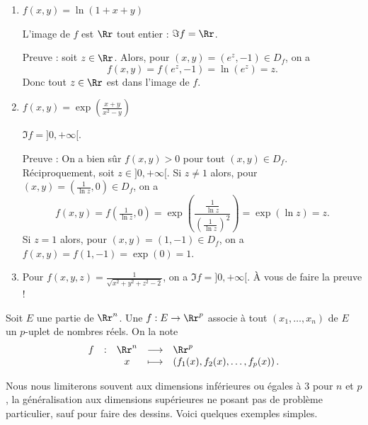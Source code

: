 \documentclass[11pt, class=report,crop=false]{standalone}
\begin{document}
\begin{exemple}
\sauteligne
\begin{enumerate}
  \item $f(x,y) = \ln(1 + x + y)$

  L'image de $f$ est $\Rr$ tout entier : $\Im f = \Rr$.
  
  Preuve : soit $z\in\Rr$. Alors, pour $(x,y) = (e^z,-1) \in D_f$, on a 
  $$f(x,y)= f(e^z,-1) = \ln(e^z)=z.$$ 
  Donc tout $z\in\Rr$ est dans l'image de $f$.
  
  \item $f(x,y) = \exp\left(\frac{x+y}{x^2-y}\right)$
 
  $\Im f = {}]0,+\infty[$.
  
  Preuve : On a bien sûr $f(x,y)>0$ pour tout $(x,y) \in D_f$.
 Réciproquement, soit $z\in {}]0,+\infty[$. 
  Si $z \neq 1$ alors, pour $(x,y)=(\tfrac{1}{\ln z},0) \in D_f$, on a 
  $$f(x,y)= f(\tfrac{1}{\ln z},0) = \exp\left(\frac{\tfrac{1}{\ln z}}{(\tfrac{1}{\ln z})^2}\right)= \exp(\ln z) = z.$$ 
 Si $z = 1$ alors, pour $(x,y)=(1,-1) \in D_f$, on a 
  $f(x,y)= f(1,-1) = \exp(0)= 1$.
    
  \item Pour $f(x,y,z) = \frac {1}{\sqrt{x^2 + y^2 + z^2 - 2}}$, on a
  $\Im f = {}]0,+ \infty[$.
  À vous de faire la preuve !
 
  
\end{enumerate}
\end{exemple}


\begin{definition}
Soit $E$ une partie de $\Rr^n$. 
Une  $f : E \to \Rr^p$ associe à tout 
$(x_1,\ldots,x_n)$ de $E$ un $p$-uplet de nombres réels.
On la note 
$$\begin{array}{ccccl}f&:&\Rr^n&\longrightarrow &\Rr^p\\ &&x&\longmapsto &\left(f_1(x),f_2(x),\ldots ,f_p(x)\right).\end{array}$$
\end{definition}


Nous nous limiterons souvent aux dimensions inférieures ou égales à $3$ pour $n$ et $p$, la généralisation aux dimensions supérieures ne posant pas de problème particulier, sauf pour faire des dessins. Voici quelques exemples simples.
\end{document}
